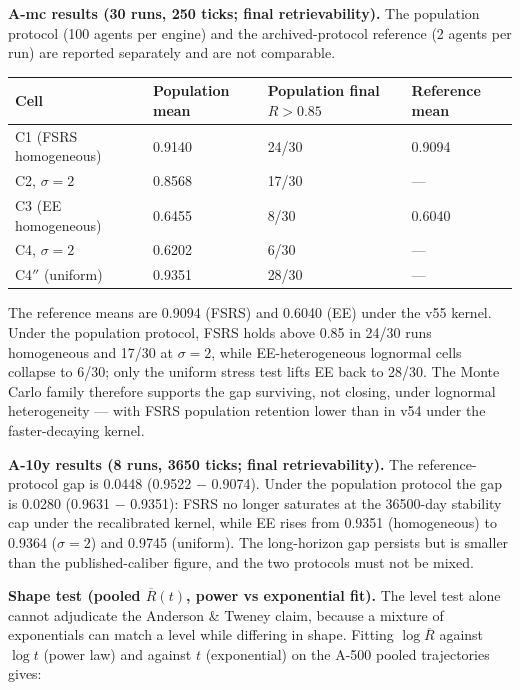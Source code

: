 \documentclass[11pt]{article}
\begin{document}
\textbf{A-mc results (30 runs, 250 ticks; final retrievability).} The population protocol (100 agents per engine) and the archived-protocol reference (2 agents per run) are reported separately and are not comparable.

\begin{table}[htbp]
\centering
\begin{tabular}{llll}
\toprule
\textbf{Cell} & \textbf{Population mean} & \textbf{Population final $R > 0.85$} & \textbf{Reference mean} \\
\midrule
C1 (FSRS homogeneous) & 0.9140 & 24/30 & 0.9094 \\
C2, $\sigma=2$ & 0.8568 & 17/30 & --- \\
C3 (EE homogeneous) & 0.6455 & 8/30 & 0.6040 \\
C4, $\sigma=2$ & 0.6202 & 6/30 & --- \\
C4$''$ (uniform) & 0.9351 & 28/30 & --- \\
\bottomrule
\end{tabular}
\end{table}

The reference means are 0.9094 (FSRS) and 0.6040 (EE) under the v55 kernel. Under the population protocol, FSRS holds above 0.85 in 24/30 runs homogeneous and 17/30 at $\sigma=2$, while EE-heterogeneous lognormal cells collapse to 6/30; only the uniform stress test lifts EE back to 28/30. The Monte Carlo family therefore supports the gap surviving, not closing, under lognormal heterogeneity --- with FSRS population retention lower than in v54 under the faster-decaying kernel.

\textbf{A-10y results (8 runs, 3650 ticks; final retrievability).} The reference-protocol gap is 0.0448 (0.9522 $-$ 0.9074). Under the population protocol the gap is 0.0280 (0.9631 $-$ 0.9351): FSRS no longer saturates at the 36500-day stability cap under the recalibrated kernel, while EE rises from 0.9351 (homogeneous) to 0.9364 ($\sigma=2$) and 0.9745 (uniform). The long-horizon gap persists but is smaller than the published-caliber figure, and the two protocols must not be mixed.

\textbf{Shape test (pooled $\overline{R}(t)$, power vs exponential fit).} The level test alone cannot adjudicate the Anderson \& Tweney claim, because a mixture of exponentials can match a level while differing in shape. Fitting $\log \overline{R}$ against $\log t$ (power law) and against $t$ (exponential) on the A-500 pooled trajectories gives:
\end{document}
